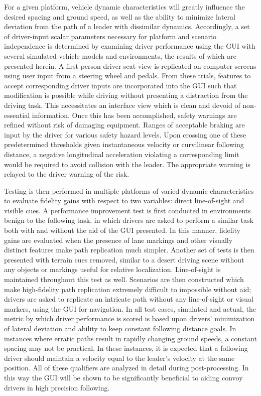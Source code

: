 For a given platform, vehicle dynamic characteristics will greatly influence the desired spacing and ground speed, as well as the ability to minimize lateral deviation from the path of a leader with dissimilar dynamics. Accordingly, a set of driver-input scalar parameters necessary for platform and scenario independence is determined by examining driver performance using the GUI with several simulated vehicle models and environments, the results of which are presented herein. A first-person driver seat view is replicated on computer screens using user input from a steering wheel and pedals. From these trials, features to accept corresponding driver inputs are incorporated into the GUI such that modification is possible while driving without presenting a distraction from the driving task. This necessitates an interface view which is clean and devoid of non-essential information. Once this has been accomplished, safety warnings are refined without risk of damaging equipment. Ranges of acceptable braking are input by the driver for various safety hazard levels. Upon crossing one of these predetermined thresholds given instantaneous velocity or curvilinear following distance, a negative longitudinal acceleration violating a corresponding limit would be required to avoid collision with the leader. The appropriate warning is relayed to the driver warning of the risk.

Testing is then performed in multiple platforms of varied dynamic characteristics to evaluate fidelity gains with respect to two variables: direct line-of-sight and visible cues. A performance improvement test is first conducted in environments benign to the following task, in which drivers are asked to perform a similar task both with and without the aid of the GUI presented. In this manner, fidelity gains are evaluated when the presence of lane markings and other visually distinct features make path replication much simpler. Another set of tests is then presented with terrain cues removed, similar to a desert driving scene without any objects or markings useful for relative localization. Line-of-sight is maintained throughout this test as well. Scenarios are then constructed which make high-fidelity path replication extremely difficult to impossible without aid; drivers are asked to replicate an intricate path without any line-of-sight or visual markers, using the GUI for navigation. In all test cases, simulated and actual, the metric by which driver performance is scored is based upon drivers' minimization of lateral deviation and ability to keep constant following distance goals. In instances where erratic paths result in rapidly changing ground speeds, a constant spacing may not be practical. In these instances, it is expected that a following driver should maintain a velocity equal to the leader's velocity at the same position. All of these qualifiers are analyzed in detail during post-processing. In this way the GUI will be shown to be significantly beneficial to aiding convoy drivers in high precision following.